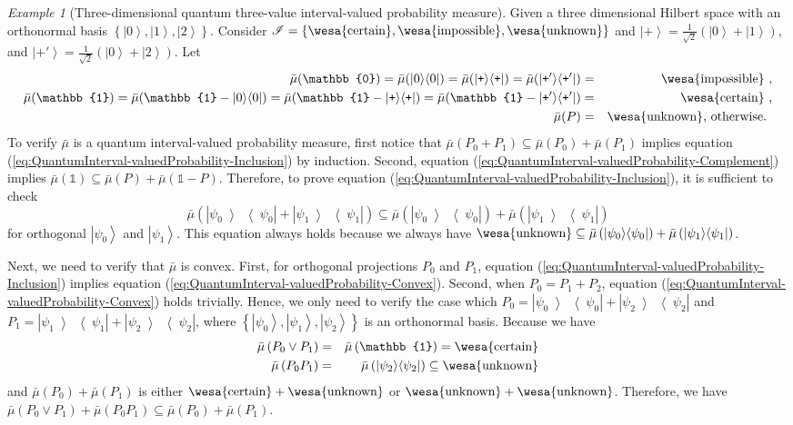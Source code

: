 \documentclass{article}
\theoremstyle{remark}
\newtheorem{example}{Example}
\newcommand{\imposs}{{\mbox{\wesa{impossible}}}}
\newcommand{\necess}{{\mbox{\wesa{certain}}}}
\newcommand{\unknown}{{\mbox{\wesa{unknown}}}}
\newcommand{\ket}[1]{{\left\vert{#1}\right\rangle}}
\newcommand{\op}[2]{\ensuremath{\left\vert{#1}\middle\rangle\middle\langle{#2}\right\vert}}
\newcommand{\proj}[1]{\op{#1}{#1}}
\newcommand{\ps}{\texttt{+}}
\begin{document}
\begin{example}[Three-dimensional quantum three-value interval-valued
probability measure]\label{ex:three-dimensional-three-value} Given
a three dimensional Hilbert space with an orthonormal basis $\left\{ \ket{0},\ket{1},\ket{2}\right\} $.
Consider\emph{ $\mathscr{I}=\left\{ \necess,\imposs,\unknown\right\} $}
and $\ket{\ps}=\frac{1}{\sqrt{2}}(\ket{0}+\ket{1})$, and $\ket{\ps'}=\frac{1}{\sqrt{2}}(\ket{0}+\ket{2})$.
Let 
\begin{eqnarray*}
\bar{\mu}(\mathbb{0})=\bar{\mu}(\proj{0})=\bar{\mu}(\proj{\ps})=\bar{\mu}(\proj{\ps'}) & = & \imposs\textrm{ ,}\\
\bar{\mu}(\mathbb{1})=\bar{\mu}(\mathbb{1}-\proj{0})=\bar{\mu}(\mathbb{1}-\proj{\ps})=\bar{\mu}(\mathbb{1}-\proj{\ps'}) & = & \necess\textrm{ ,}\\
\bar{\mu}(P) & = & \unknown\textrm{, otherwise. }
\end{eqnarray*}
To verify $\bar{\mu}$ is a quantum interval-valued probability
measure, first notice that
$\bar{\mu}\left(P_{0}+P_{1}\right)\subseteq\bar{\mu}\left(P_{0}\right)+\bar{\mu}\left(P_{1}\right)$
implies equation
(\ref{eq:QuantumInterval-valuedProbability-Inclusion}) by
induction. Second, equation
(\ref{eq:QuantumInterval-valuedProbability-Complement}) implies
$\bar{\mu}\left(\mathbb{1}\right)\subseteq\bar{\mu}\left(P\right)+\bar{\mu}\left(\mathbb{1}-P\right)$.
Therefore, to prove equation
(\ref{eq:QuantumInterval-valuedProbability-Inclusion}), it is
sufficient to check
\[
\bar{\mu}\left(\proj{\psi_{0}}+\proj{\psi_{1}}\right)\subseteq\bar{\mu}\left(\proj{\psi_{0}}\right)+\bar{\mu}\left(\proj{\psi_{1}}\right)
\]
for orthogonal $\ket{\psi_{0}}$ and $\ket{\psi_{1}}$. This equation
always holds because we always have $\unknown\subseteq\bar{\mu}\left(\proj{\psi_{0}}\right)+\bar{\mu}\left(\proj{\psi_{1}}\right)$.

Next, we need to verify that $\bar{\mu}$ is convex. First, for orthogonal
projections $P_{0}$ and $P_{1}$, equation (\ref{eq:QuantumInterval-valuedProbability-Inclusion})
implies equation (\ref{eq:QuantumInterval-valuedProbability-Convex}).
Second, when $P_{0}=P_{1}+P_{2}$, equation
(\ref{eq:QuantumInterval-valuedProbability-Convex}) holds trivially.
Hence, we only need to verify the case which $P_{0}=\proj{\psi_{0}}+\proj{\psi_{2}}$
and $P_{1}=\proj{\psi_{1}}+\proj{\psi_{2}}$,
where $\left\{ \ket{\psi_{0}},\ket{\psi_{1}},\ket{\psi_{2}}\right\} $
is an orthonormal basis. Because we have 
\begin{eqnarray*}
\bar{\mu}\left(P_{0}\vee P_{1}\right) & = & \bar{\mu}\left(\mathbb{1}\right)=\necess\\
\bar{\mu}\left(P_{0}P_{1}\right) & = & \bar{\mu}\left(\proj{\psi_{2}}\right)\subseteq\unknown
\end{eqnarray*}
and $\bar{\mu}\left(P_{0}\right)+\bar{\mu}\left(P_{1}\right)$
is either $\necess+\unknown$ or $\unknown+\unknown$.
Therefore, we have $\bar{\mu}\left(P_{0}\vee P_{1}\right)+\bar{\mu}\left(P_{0}P_{1}\right)\subseteq\bar{\mu}\left(P_{0}\right)+\bar{\mu}\left(P_{1}\right)$.


\end{example}
\end{document}
